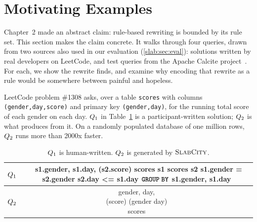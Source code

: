 \section{Motivating Examples}
\label{slab:sec:motivating-example}

Chapter~2 made an abstract claim: rule-based rewriting is bounded by
its rule set. This section makes the claim concrete. It walks through
four queries, drawn from two sources also used in our evaluation
(\cref{slab:sec:eval}): solutions written by real developers on
LeetCode, and test queries from the Apache Calcite
project~\cite{calcite}. For each, we show the rewrite \slabcity
finds, and examine why encoding that rewrite as a rule would be
somewhere between painful and hopeless.

LeetCode problem \#1308 asks, over a table \texttt{scores} with
columns \texttt{(gender,day,score)} and primary key
\texttt{(gender,day)}, for the running total score of each gender on
each day. $Q_1$ in Table~\ref{slab:tab:Q1-Q2} is a
participant-written solution; $Q_2$ is what \slabcity produces
from it. On a randomly populated database of one million rows,
$Q_2$ runs more than 2000x faster. 

\begin{table}[!t]
\footnotesize
\caption{$Q_1$ is human-written. $Q_2$ is generated by $\textsc{SlabCity}$.}
\vspace{-5pt}
\begin{tabular}{|c|c|}
\hline
 $Q_1$

 & 
 
 \makecell[l]{\sqlselectcolor \  \sqldistinctcolor s1.gender, s1.day, \sqlsumcolor(s2.score)\\
              \sqlfromcolor scores \sqlascolor s1 \sqljoincolor scores \sqlascolor s2 \\
              \hspace{2em} \sqloncolor s1.gender = s2.gender\\
              \sqlwherecolor s2.day <= s1.day \\
              ${\color{black}{{\textbf{\texttt{GROUP}}\;\textbf{\texttt{BY}}}}}$ s1.gender, s1.day
              }  
\\
\hline
$Q_2$
&
 \makecell[l]{ \sqlselectcolor gender, day, \\ \hspace{1em} \sqlsumcolor(score) \sqlovercolor (\sqlpartitionbycolor gender \sqlorderbycolor day) \\
 \sqlfromcolor scores}
  \\
 \hline
\end{tabular}

\vspace{-5pt}
\label{slab:tab:Q1-Q2}
\end{table}



